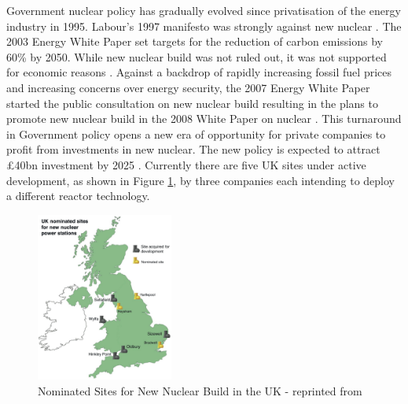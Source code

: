 Government nuclear policy has gradually evolved since privatisation of the energy industry in 1995. 
Labour’s 1997 manifesto was strongly against new nuclear \cite{Birmingham2012}. 
The 2003 Energy White Paper set targets for the reduction of carbon emissions by 60\% by 2050. 
While new nuclear build was not ruled out, it was not supported for economic reasons \cite{WP2003}. 
Against a backdrop of rapidly increasing fossil fuel prices and increasing concerns over energy security, the 2007 Energy White Paper started the public consultation on new nuclear build \cite{WP2007} resulting in the plans to promote new nuclear build in the 2008 White Paper on nuclear \cite{WP2008}.
This turnaround in Government policy opens a new era of opportunity for private companies to profit from investments in new nuclear. 
The new policy is expected to attract \pounds40bn investment by 2025 \cite{Birmingham2012}.
Currently there are five UK sites under active development, as shown in Figure \ref{figure:NNB}, by three companies each intending to deploy a different reactor technology.

\begin{figure}[!h]
\centering
\includegraphics[width = 0.4\textwidth]{Figures/uk-nuclear-map.jpeg}
\caption{Nominated Sites for New Nuclear Build in the UK - reprinted from \cite{NAMRC}}
\label{figure:NNB}
\end{figure}

